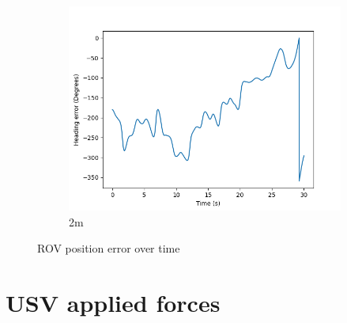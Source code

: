 \documentclass[class=article, crop=false]{standalone}
\begin{document}
\begin{figure}
\begin{subfigure}[b]{0.48\textwidth}
        \includegraphics{scenario1/rov-100m/2.0m/usv_heading_error_controlled}
        \caption{2m}
        \label{}
    \end{subfigure}

    \caption{ROV position error over time}
\end{figure}

\section{USV applied forces}
\end{document}
